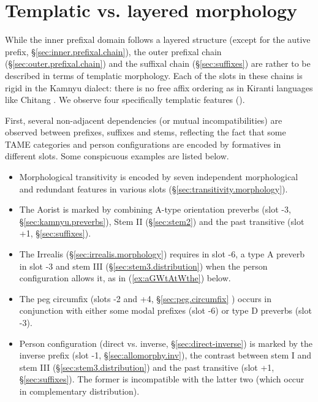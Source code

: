  

 \section{Templatic vs. layered morphology} \label{sec:templatic.verb}
   
While the inner prefixal domain follows a layered structure (except for the autive prefix, §\ref{sec:inner.prefixal.chain}), the outer prefixal chain (§\ref{sec:outer.prefixal.chain}) and the suffixal chain (§\ref{sec:suffixes}) are rather to be described in terms of templatic morphology. Each of the slots in these chains is rigid in the Kamnyu dialect: there is no free affix ordering as in Kiranti languages like Chitang \citep{bickel07chintang}. We observe four specifically templatic features (\citealt[216--218]{bickel07inflectional}). 

First, several non-adjacent dependencies (or mutual incompatibilities) are observed between prefixes, suffixes and stems, reflecting the fact that some TAME categories and person configurations are encoded by formatives in different slots. Some conspicuous examples are listed below.

\begin{itemize}
\item Morphological transitivity is encoded by seven independent morphological and redundant features in various slots (§\ref{sec:transitivity.morphology}).
\item The Aorist is marked by combining A-type orientation preverbs  (slot -3, §\ref{sec:kamnyu.preverbs}), Stem II (§\ref{sec:stem2}) and the past transitive  (slot +1, §\ref{sec:suffixes}).
\item  The Irrealis (§\ref{sec:irrealis.morphology}) requires  in slot -6, a type A preverb in slot -3 and stem III (§\ref{sec:stem3.distribution}) when the person configuration allows it, as in (\ref{ex:aGWtAtWthe}) below.
\item The peg circumfix  (slots -2 and +4, §\ref{sec:peg.circumfix} ) occurs in conjunction with either some modal prefixes (slot -6) or type D preverbs (slot -3).
\item   Person configuration (direct vs. inverse, §\ref{sec:direct-inverse}) is marked by the inverse prefix (slot -1, §\ref{sec:allomorphy.inv}), the contrast between stem I and stem III (§\ref{sec:stem3.distribution}) and the past transitive  (slot +1, §\ref{sec:suffixes}). The former is incompatible with the latter two (which occur in complementary distribution). 
\end{itemize}

